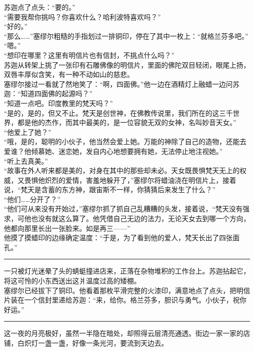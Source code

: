 \documentclass[oneside,11pt]{memoir} %
\begin{document}
\begin{CJK}{UTF8}{gbsn}
    苏迦点了点头：“要的。”\\\indent
    “需要我帮你挑吗？你喜欢什么？哈利波特喜欢吗？”\\\indent
    “好的。”\\\indent
    “那么……”塞缪尔粗糙的手指划过一排铜印，停在了其中一枚上：“就格兰芬多吧。”\\\indent
    “嗯。”\\\indent
    “想印在哪里？这里有明信片也有信封，不挑点什么吗？”\\\indent
    苏迦从转架上挑了一张印有石雕佛像的明信片，里面的佛陀双目轻闭，眼尾上扬，双唇丰厚似含笑，有一种不动如山的慈悲。\\\indent
    塞缪尔接过一看就了然地笑了：“啊，四面佛。”他一边在酒精灯上融蜡一边问苏迦：“知道四面佛的起源吗？”\\\indent
    “知道一点吧。印度教里的梵天吗？”\\\indent
    “是的，是的，但又不止。梵天是创世神，在佛教传说里，我们所在的这三千世界，都是他的杰作，而其中最美的，是一位容貌无双的女神，名叫妙音天女。”\\\indent
    “他爱上了她？”\\\indent
    “哦，是的，聪明的小伙子，他当然会爱上她。万能的神除了自己的造物，还能去爱谁？他倾慕她、迷恋她，发自内心地想要拥有她，无法停止地注视她。”\\\indent
    “听上去真美。”\\\indent
    “故事在外人听来都是美的，对身在其中的那些却未必。天女既畏惧梵天无上的权威，又畏惧他炽烈的爱情，害羞地躲开了，”塞缪尔将蜡油浇在明信片上，接着说，“梵天是含蓄的东方神，跟宙斯不一样，你猜猜后来发生了什么？”\\\indent
    “他们……分开了？”\\\indent
    “他们可从来没有开始过，”塞缪尔抓了抓自己乱糟糟的头发，接着说，“梵天没有强求，可他也没有就这么算了。他凭借自己无边的法力，无论天女去到哪一个方向，他都向那里长出一张脸来。如是再三——”\\\indent
    他摸了摸蜡印的边缘确定温度：“于是，为了看到他的爱人，梵天长出了四张面孔。”\\\indent
  \rule{-3pt}{30pt}
    一只被灯光迷晕了头的蜻蜓撞进店来，正落在杂物堆积的工作台上。苏迦拈起它，将这可怜的小东西送出这爿温度过高的矮棚。\\\indent
    塞缪尔已经拔下了铜印。他看着那枚平滑完整的火漆印，满意地点了点头，把明信片装在一个信封里递给苏迦：“来，给你。格兰芬多，胆识与勇气。小伙子，祝你好运。”\\\indent
  \rule{-3pt}{30pt}
    这一夜的月亮极好，虽然一半隐在暗处，却照得云层清亮通透。街边一家一家的店铺，白炽灯一盏一盏，好像一条光河，要流到天边去。\\\indent

\end{CJK}
\end{document}
